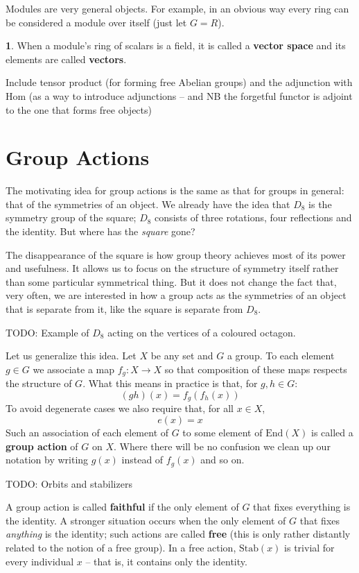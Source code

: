 \documentclass[oneside,english]{amsbook}
\numberwithin{section}{chapter}
\theoremstyle{plain}
\theoremstyle{definition}
\newtheorem{defn}[thm]{\protect\definitionname}
\providecommand{\definitionname}{Definition}
\begin{document}
Modules are very general objects. For example, in an obvious way every ring can be considered a module over itself (just let $G = R$).

\begin{defn}
	When a module's ring of scalars is a field, it is called a \textbf{vector space} and its elements are called \textbf{vectors}.
\end{defn}




Include tensor product (for forming free Abelian groups) and the adjunction with Hom (as a way to introduce adjunctions -- and NB the forgetful functor is adjoint to the one that forms free objects)


\section{Group Actions}

The motivating idea for group actions is the same as that for groups in general: that of the symmetries of an object. We already have the idea that $D_8$ is the symmetry group of the square; $D_8$ consists of three rotations, four reflections and the identity. But where has the \emph{square} gone? 

The disappearance of the square is how group theory achieves most of its power and usefulness. It allows us to focus on the structure of symmetry itself rather than some particular symmetrical thing. But it does not change the fact that, very often, we are interested in how a group acts as the symmetries of an object that is separate from it, like the square is separate from $D_8$.

TODO: Example of $D_8$ acting on the vertices of a coloured octagon. 

Let us generalize this idea. Let $X$ be any set and $G$ a group. To each element $g\in G$ we associate a map $f_g:X\to X$ so that composition of these maps respects the structure of $G$. What this means in practice is that, for $g, h\in G$:
\[
	(gh)(x) = f_g(f_h(x))
\]
To avoid degenerate cases we also require that, for all $x\in X$,
\[
	e(x) = x
\]
Such an association of each element of $G$ to some element of $\text{End}(X)$ is called a \textbf{group action} of $G$ on $X$. Where there will be no confusion we clean up our notation by writing $g(x)$ instead of $f_g(x)$ and so on.


TODO: Orbits and stabilizers


A group action is called \textbf{faithful} if the only element of $G$ that fixes everything is the identity. A stronger situation occurs when the only element of $G$ that fixes \emph{anything} is the identity; such actions are called \textbf{free} (this is only rather distantly related to the notion of a free group). In a free action, $\text{Stab}(x)$ is trivial for every individual $x$ -- that is, it contains only the identity.
\end{document}

